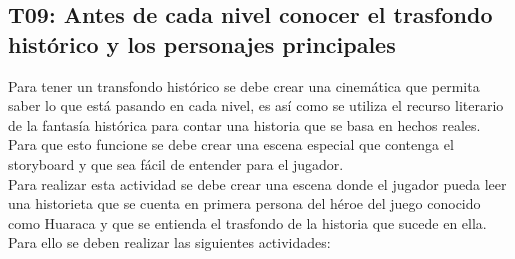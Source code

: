\documentclass[a4paper, openright, 12pt]{report}
\begin{document}
\subsection*{T09: Antes de cada nivel conocer el trasfondo histórico y los personajes principales}
\justify
Para tener un transfondo histórico se debe crear una cinemática que permita saber lo que está pasando en cada nivel, es así como se utiliza el recurso literario de la fantasía histórica para contar una historia que se basa en hechos reales.
Para que esto funcione se debe crear una escena especial que contenga el storyboard y que sea fácil de entender para el jugador.\\
Para realizar esta actividad se debe crear una escena donde el jugador pueda leer una historieta que se cuenta en primera persona del héroe del juego conocido como Huaraca y que se entienda el trasfondo de la historia que sucede en ella. Para ello se deben realizar las siguientes actividades:
\end{document}

